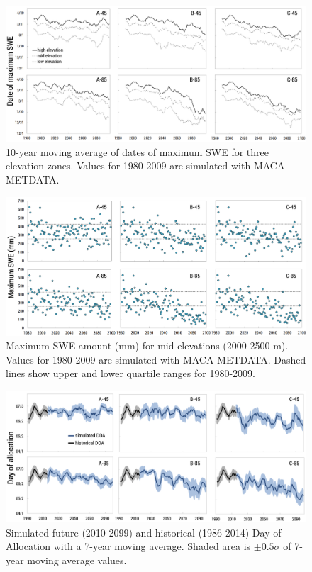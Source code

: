 \documentclass[11pt,letterpaper]{article}
\begin{document}
\begin{figure}
\centering
\includegraphics[width=\textwidth]{figure-files/figure13.png}
\caption{10-year moving average of dates of maximum SWE for three elevation zones. Values for 1980-2009 are simulated with MACA METDATA.}
\label{fig:MaxSWEDate}
\end{figure}
\clearpage

\begin{figure}
\centering
\includegraphics[width=\textwidth]{figure-files/figure14.png}
\caption{Maximum SWE amount (mm) for mid-elevations (2000-2500 m). Values for 1980-2009 are simulated with MACA METDATA. Dashed lines show upper and lower quartile ranges for 1980-2009.}
\label{fig:MaxSWEMidElev}
\end{figure}
\clearpage

\begin{figure}
\centering
\includegraphics[width=\textwidth]{figure-files/figure15.png}
\caption{Simulated future (2010-2099) and historical (1986-2014) Day of Allocation with a 7-year moving average. Shaded area is $\pm 0.5\sigma$ of 7-year moving average values.}
\label{fig:FutureDayOfAllocation}
\end{figure}
\clearpage
\end{document}
